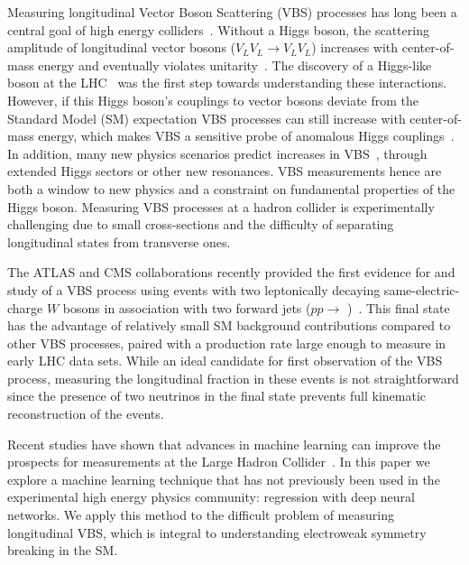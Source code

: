 
Measuring longitudinal Vector Boson Scattering (VBS) processes has
long been a central goal of high energy
colliders~\cite{SSC_1}. Without a Higgs boson, the scattering
amplitude of longitudinal vector bosons ($V_{L}V_{L} \rightarrow
V_{L}V_{L}$) increases with center-of-mass energy and eventually
violates unitarity~\cite{Uni_1,Uni_2,Uni_3}. The discovery of a
Higgs-like boson at the LHC~\cite{ATLAS_higgs,CMS_higgs} was the first
step towards understanding these interactions. However, if this Higgs
boson's couplings to vector bosons deviate from the Standard Model
(SM) expectation VBS processes can still increase with center-of-mass
energy, which makes VBS a sensitive probe of anomalous Higgs
couplings~\cite{Higgs_con}. In addition, many new physics scenarios
predict increases in
VBS~\cite{Tmatrix,VLVLBSM,Trip_Higgs_old,Trip_higgs_new}, through
extended Higgs sectors or other new resonances. VBS measurements hence
are both a window to new physics and a constraint on fundamental properties
of the Higgs boson. Measuring VBS processes at a hadron collider is
experimentally challenging due to small cross-sections and the
difficulty of separating longitudinal states from transverse ones.

The ATLAS and CMS collaborations recently provided the first evidence
for and study of a VBS process using events with two leptonically
decaying same-electric-charge $W$ bosons in association with two
forward jets ($pp \to$ \ssWW)~\cite{ATLAS_ssWW,CMS_ssWW}. This final
state has the advantage of relatively small SM background
contributions compared to other VBS processes, paired with a
production rate large enough to measure in early LHC data sets.  While
an ideal candidate for first observation of the VBS process, measuring
the longitudinal fraction in these events is not straightforward since
the presence of two neutrinos in the final state prevents full
kinematic reconstruction of the events.

Recent studies have shown that advances in machine learning can
improve the prospects for measurements at the Large Hadron
Collider~\cite{Baldi:2014kfa,Baldi:2014pta}.  In this paper we explore
a machine learning technique that has not previously been used in the
experimental high energy physics community: regression with deep
neural networks. We apply this method to the difficult problem of
measuring longitudinal VBS, which is integral to understanding
electroweak symmetry breaking in the SM.

